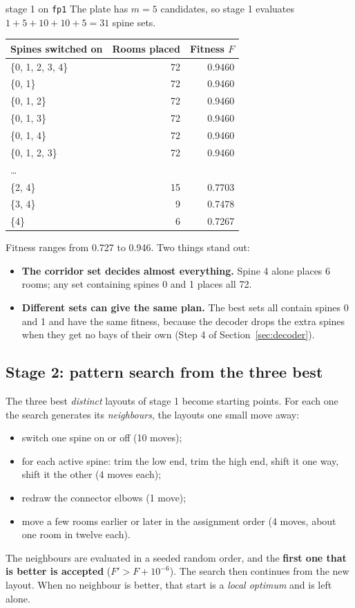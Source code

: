 \documentclass[10pt,a4paper]{article}
\newcommand{\code}[1]{\texttt{\small #1}}
\begin{document}
\begin{example}{stage 1 on \code{fp1}}
The plate has $m = 5$ candidates, so stage 1 evaluates $1 + 5 + 10 + 10 + 5 = 31$ spine sets.
\begin{center}\centering\small
\begin{tabular}{@{}l r r@{}}
\toprule
\textbf{Spines switched on} & \textbf{Rooms placed} & \textbf{Fitness $F$} \\ \midrule
\{0, 1, 2, 3, 4\} & 72 & 0.9460 \\
\{0, 1\} & 72 & 0.9460 \\
\{0, 1, 2\} & 72 & 0.9460 \\
\{0, 1, 3\} & 72 & 0.9460 \\
\{0, 1, 4\} & 72 & 0.9460 \\
\{0, 1, 2, 3\} & 72 & 0.9460 \\
\ldots &  &  \\
\{2, 4\} & 15 & 0.7703 \\
\{3, 4\} & 9 & 0.7478 \\
\{4\} & 6 & 0.7267 \\
\bottomrule
\end{tabular}
\end{center}
Fitness ranges from 0.727 to 0.946. Two things stand out:
\begin{itemize}
\item \textbf{The corridor set decides almost everything.} Spine 4 alone places 6 rooms; any set containing
spines 0 and 1 places all 72.
\item \textbf{Different sets can give the same plan.} The best sets all contain spines 0 and 1 and have the same
fitness, because the decoder drops the extra spines when they get no bays of their own (Step 4 of
Section~\ref{sec:decoder}).
\end{itemize}
\end{example}

\subsection{Stage 2: pattern search from the three best}
The three best \emph{distinct} layouts of stage 1 become starting points. For each one the search generates its
\emph{neighbours}, the layouts one small move away:
\begin{itemize}
\item switch one spine on or off (10 moves);
\item for each active spine: trim the low end, trim the high end, shift it one way, shift it the other (4 moves each);
\item redraw the connector elbows (1 move);
\item move a few rooms earlier or later in the assignment order (4 moves, about one room in twelve each).
\end{itemize}
The neighbours are evaluated in a seeded random order, and the \textbf{first one that is better is accepted}
($F' > F + 10^{-6}$). The search then continues from the new layout. When no neighbour is better, that start is a
\emph{local optimum} and is left alone.
\end{document}
